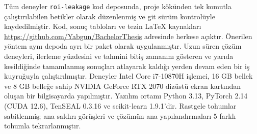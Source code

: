 Tüm deneyler \texttt{roi-leakage} kod deposunda, proje kökünden tek komutla çalıştırılabilen betikler olarak düzenlenmiş ve git sürüm kontrolüyle kaydedilmiştir. Kod, sonuç tabloları ve tezin LaTeX kaynakları \url{https://github.com/Yabgun/BachelorThesis} adresinde herkese açıktır. Önerilen yöntem aynı depoda ayrı bir paket olarak uygulanmıştır. Uzun süren çözüm deneyleri, ilerleme yüzdesini ve tahmini bitiş zamanını gösteren ve yarıda kesildiğinde tamamlanmış sonuçları atlayarak kaldığı yerden devam eden bir iş kuyruğuyla çalıştırılmıştır. Deneyler Intel Core i7-10870H işlemci, 16 GB bellek ve 8 GB belleğe sahip NVIDIA GeForce RTX 2070 dizüstü ekran kartından oluşan bir bilgisayarda yapılmıştır. Yazılım ortamı Python 3.13, PyTorch 2.14 (CUDA 12.6), TenSEAL 0.3.16 ve scikit-learn 1.9.1'dir. Rastgele tohumlar sabitlenmiş; ana saldırı görüşleri ve çözümün ana yapılandırmaları 5 farklı tohumla tekrarlanmıştır.

